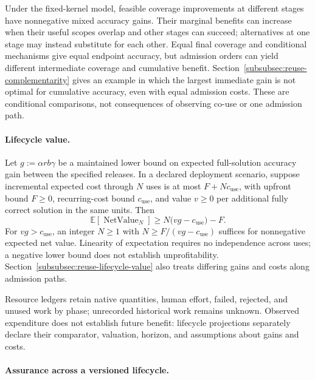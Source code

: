 \documentclass[10pt]{article} %
\providecommand{\1}{\mathbf{1}}  %
\theoremstyle{remark}
\theoremstyle{definition}
\begin{document}
Under the fixed-kernel model, feasible coverage improvements at different
stages have nonnegative mixed accuracy gains. Their marginal benefits can
increase when their useful scopes overlap and other stages can succeed;
alternatives at one stage may instead substitute for each other. Equal
final coverage and conditional mechanisms give equal endpoint accuracy,
but admission orders can yield different intermediate coverage and
cumulative benefit. Section~\ref{subsubsec:reuse-complementarity} gives an
example in which the largest immediate gain is not optimal for cumulative
accuracy, even with equal admission costs. These are conditional
comparisons, not consequences of observing co-use or one admission path.

\paragraph{Lifecycle value.}

Let $g:=\alpha rb\gamma$ be a maintained lower bound on expected
full-solution accuracy gain between the specified releases. In a declared
deployment scenario, suppose incremental expected
cost through $N$ uses is at most $F+Nc_{\mathrm{use}}$, with upfront bound
$F\geq0$, recurring-cost bound $c_{\mathrm{use}}$, and
value $v\geq0$ per additional fully correct solution in the same units.
Then
\begin{equation}
\mathbb E[\operatorname{NetValue}_N]
\geq N\bigl(vg-c_{\mathrm{use}}\bigr)-F.
\label{eq:intro-reuse-net-value}
\end{equation}
For $vg>c_{\mathrm{use}}$, an integer $N\geq1$ with
$N\geq F/(vg-c_{\mathrm{use}})$ suffices for nonnegative expected net
value. Linearity of expectation requires no independence across uses;
a negative lower bound does not establish unprofitability.
Section~\ref{subsubsec:reuse-lifecycle-value} also treats differing gains
and costs along admission paths.

Resource ledgers retain native quantities, human effort, failed, rejected,
and unused work by phase; unrecorded historical work remains unknown.
Observed expenditure does not establish future benefit: lifecycle
projections separately declare their comparator, valuation, horizon, and
assumptions about gains and costs.

\paragraph{Assurance across a versioned lifecycle.}
\end{document}
